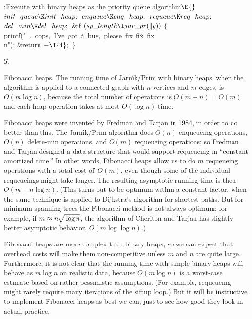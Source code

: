 \Y\B\4:Execute  with binary heaps as the priority
queue algorithm\X${}\E{}$\6
$\\{init\_queue}\K\\{init\_heap};{}$\6
${}\\{enqueue}\K\\{enq\_heap};{}$\6
${}\\{requeue}\K\\{req\_heap};{}$\6
${}\\{del\_min}\K\\{del\_heap};{}$\6
\&{if} ${}(\\{sp\_length}\I\\{jar\_pr}(\|g)){}$\5
${}\{{}$\1\6
\\{printf}(\.{"\ ...oops,\ I've\ got\ }\)\.{a\ bug,\ please\ fix\ fi}\)\.{x\
fix\\n"});\6
\&{return} ${}{-}\T{4};{}$\6
\4${}\}{}$\2\par
\U5.\fi

Fibonacci heaps.
The running time of Jarn{\'\i}k/Prim with binary heaps, when the algorithm is
applied to a connected graph with $n$ vertices and $m$ edges, is $O(m\log n)$,
because the total number of operations is $O(m+n)=O(m)$ and each
heap operation takes at most $O(\log n)$ time.

Fibonacci heaps were invented by Fredman and Tarjan in 1984, in order
to do better than this. The Jarn{\'\i}k/Prim algorithm does $O(n)$
enqueueing operations, $O(n)$ delete-min operations, and $O(m)$
requeueing operations; so Fredman and Tarjan designed a data structure
that would support requeueing in ``constant amortized time.'' In other
words, Fibonacci heaps allow us to do $m$ requeueing operations with a
total cost of~$O(m)$, even though some of the individual requeueings
might take longer. The resulting asymptotic running time is then
$O(m+n\log n)$. (This turns out to be optimum within a constant
factor, when the same technique is applied to Dijkstra's algorithm for
shortest paths. But for minimum spanning trees the Fibonacci method is
not always optimum; for example, if $m\approx n\sqrt{\mathstrut\log n}$, the
algorithm of Cheriton and Tarjan has slightly better asymptotic
behavior, $O(m\log\log n)$.)

Fibonacci heaps are more complex than binary heaps, so we can expect
that overhead  costs will make them non-competitive unless $m$ and $n$ are
quite large. Furthermore, it is not clear that the running time with simple
binary heaps will behave as $m\log n$ on realistic data, because
$O(m\log n)$ is a worst-case estimate based on rather pessimistic
assumptions. (For example, requeueing might rarely require many
iterations of the siftup loop.) But it will be instructive to
implement Fibonacci heaps as best we can, just to see how good they
look in actual practice.

